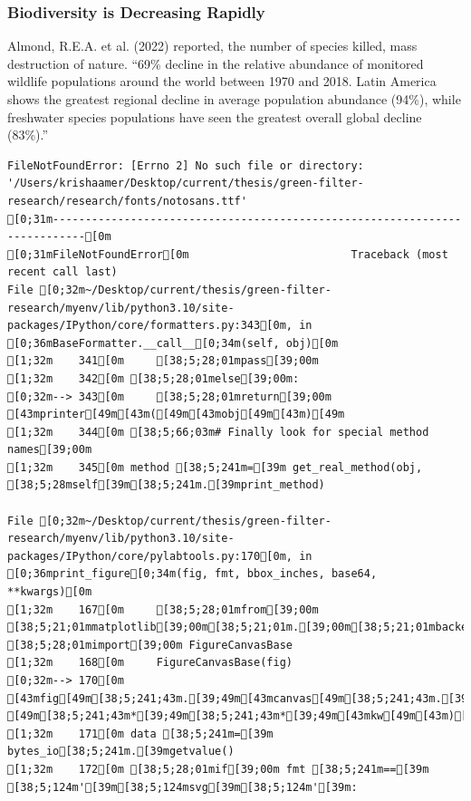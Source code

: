 \documentclass[
  letterpaper,
  DIV=11,
  numbers=noendperiod]{scrartcl}
\begin{document}
\subsubsection{Biodiversity is Decreasing
Rapidly}\label{biodiversity-is-decreasing-rapidly}

Almond, R.E.A. et al. (2022) reported, the number of species killed,
mass destruction of nature. ``69\% decline in the relative abundance of
monitored wildlife populations around the world between 1970 and 2018.
Latin America shows the greatest regional decline in average population
abundance (94\%), while freshwater species populations have seen the
greatest overall global decline (83\%).''

\begin{verbatim}
FileNotFoundError: [Errno 2] No such file or directory: '/Users/krishaamer/Desktop/current/thesis/green-filter-research/research/fonts/notosans.ttf'
[0;31m---------------------------------------------------------------------------[0m
[0;31mFileNotFoundError[0m                         Traceback (most recent call last)
File [0;32m~/Desktop/current/thesis/green-filter-research/myenv/lib/python3.10/site-packages/IPython/core/formatters.py:343[0m, in [0;36mBaseFormatter.__call__[0;34m(self, obj)[0m
[1;32m    341[0m     [38;5;28;01mpass[39;00m
[1;32m    342[0m [38;5;28;01melse[39;00m:
[0;32m--> 343[0m     [38;5;28;01mreturn[39;00m [43mprinter[49m[43m([49m[43mobj[49m[43m)[49m
[1;32m    344[0m [38;5;66;03m# Finally look for special method names[39;00m
[1;32m    345[0m method [38;5;241m=[39m get_real_method(obj, [38;5;28mself[39m[38;5;241m.[39mprint_method)

File [0;32m~/Desktop/current/thesis/green-filter-research/myenv/lib/python3.10/site-packages/IPython/core/pylabtools.py:170[0m, in [0;36mprint_figure[0;34m(fig, fmt, bbox_inches, base64, **kwargs)[0m
[1;32m    167[0m     [38;5;28;01mfrom[39;00m [38;5;21;01mmatplotlib[39;00m[38;5;21;01m.[39;00m[38;5;21;01mbackend_bases[39;00m [38;5;28;01mimport[39;00m FigureCanvasBase
[1;32m    168[0m     FigureCanvasBase(fig)
[0;32m--> 170[0m [43mfig[49m[38;5;241;43m.[39;49m[43mcanvas[49m[38;5;241;43m.[39;49m[43mprint_figure[49m[43m([49m[43mbytes_io[49m[43m,[49m[43m [49m[38;5;241;43m*[39;49m[38;5;241;43m*[39;49m[43mkw[49m[43m)[49m
[1;32m    171[0m data [38;5;241m=[39m bytes_io[38;5;241m.[39mgetvalue()
[1;32m    172[0m [38;5;28;01mif[39;00m fmt [38;5;241m==[39m [38;5;124m'[39m[38;5;124msvg[39m[38;5;124m'[39m:


\end{verbatim}
\end{document}
